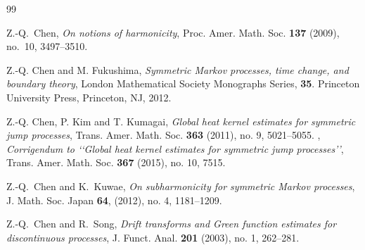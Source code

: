 \documentclass[12pt,a4paper]{article}
\newcommand{\1}{{\bf 1}}
\begin{document}
\begin{thebibliography}{99}




%
%
%



{Z.-Q.~Chen}, 
\emph{On notions of harmonicity}, Proc. Amer. Math. Soc. {\bf 137} (2009), no.~10, 3497--3510.

{Z.-Q. Chen and M. Fukushima}, 
\emph{Symmetric Markov processes, time change, and
boundary theory}, London Mathematical Society Monographs Series, {\bf 35}. Princeton University Press, Princeton, NJ, 2012.  

{Z.-Q. Chen, P. Kim and T. Kumagai},
\emph{Global heat kernel estimates for symmetric jump processes},
Trans. Amer. Math. Soc. {\bf 363} (2011), no. 9, 5021--5055.
\bysame, 
\emph{Corrigendum to \lq\lq Global heat kernel estimates for symmetric jump processes\rq\rq},
Trans. Amer. Math. Soc. {\bf 367} (2015), no. 10, 7515.

{Z.-Q.~Chen and K.~Kuwae}, 
\emph{On subharmonicity for symmetric Markov processes}, 
J. Math. Soc. Japan
{\bf 64}, (2012), no. 4, 1181--1209.

%
%
%

{Z.-Q.~Chen and R.~Song},
\emph{Drift transforms and Green function estimates for discontinuous processes},
J. Funct. Anal. {\bf 201} (2003), no. 1, 262--281.
  


\end{thebibliography}
\end{document}
